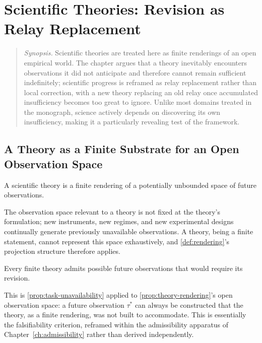 \chapter{Scientific Theories: Revision as Relay Replacement}
\label{ch:science}

\begin{quotation}
\noindent\textit{Synopsis.} Scientific theories are treated here as finite
renderings of an open empirical world. The chapter argues that a theory
inevitably encounters observations it did not anticipate and therefore
cannot remain sufficient indefinitely; scientific progress is reframed as
relay replacement rather than local correction, with a new theory replacing
an old relay once accumulated insufficiency becomes too great to ignore.
Unlike most domains treated in the monograph, science actively depends on
discovering its own insufficiency, making it a particularly revealing test
of the framework.
\end{quotation}

\section{A Theory as a Finite Substrate for an Open Observation Space}

\begin{proposition}
\label{prop:theory-rendering}
A scientific theory is a finite rendering of a potentially unbounded
space of future observations.
\end{proposition}

\begin{proofsketch}
The observation space relevant to a theory is not fixed at the theory's
formulation; new instruments, new regimes, and new experimental designs
continually generate previously unavailable observations. A theory,
being a finite statement, cannot represent this space exhaustively, and
\cref{def:rendering}'s projection structure therefore applies.
\end{proofsketch}

\begin{proposition}
\label{prop:revision-necessity}
Every finite theory admits possible future observations that would
require its revision.
\end{proposition}

\begin{proofsketch}
This is \cref{prop:task-unavailability} applied to
\cref{prop:theory-rendering}'s open observation space: a future
observation $\tau^*$ can always be constructed that the theory, as a
finite rendering, was not built to accommodate. This is essentially the
falsifiability criterion, reframed within the admissibility apparatus of
Chapter~\ref{ch:admissibility} rather than derived independently.
\end{proofsketch}

